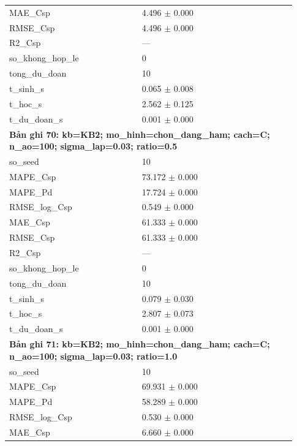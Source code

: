 \begin{longtable}{p{0.43\linewidth}p{0.50\linewidth}}
MAE\_\allowbreak Csp & 4.496 $\pm$ 0.000 \\
RMSE\_\allowbreak Csp & 4.496 $\pm$ 0.000 \\
R2\_\allowbreak Csp & — \\
so\_\allowbreak khong\_\allowbreak hop\_\allowbreak le & 0 \\
tong\_\allowbreak du\_\allowbreak doan & 10 \\
t\_\allowbreak sinh\_\allowbreak s & 0.065 $\pm$ 0.008 \\
t\_\allowbreak hoc\_\allowbreak s & 2.562 $\pm$ 0.125 \\
t\_\allowbreak du\_\allowbreak doan\_\allowbreak s & 0.001 $\pm$ 0.000 \\
\midrule
\multicolumn{2}{p{0.95\linewidth}}{\textbf{Bản ghi 70: kb=KB2; mo\_hinh=chon\_dang\_ham; cach=C; n\_ao=100; sigma\_lap=0.03; ratio=0.5}} \\
so\_\allowbreak seed & 10 \\
MAPE\_\allowbreak Csp & 73.172 $\pm$ 0.000 \\
MAPE\_\allowbreak Pd & 17.724 $\pm$ 0.000 \\
RMSE\_\allowbreak log\_\allowbreak Csp & 0.549 $\pm$ 0.000 \\
MAE\_\allowbreak Csp & 61.333 $\pm$ 0.000 \\
RMSE\_\allowbreak Csp & 61.333 $\pm$ 0.000 \\
R2\_\allowbreak Csp & — \\
so\_\allowbreak khong\_\allowbreak hop\_\allowbreak le & 0 \\
tong\_\allowbreak du\_\allowbreak doan & 10 \\
t\_\allowbreak sinh\_\allowbreak s & 0.079 $\pm$ 0.030 \\
t\_\allowbreak hoc\_\allowbreak s & 2.807 $\pm$ 0.073 \\
t\_\allowbreak du\_\allowbreak doan\_\allowbreak s & 0.001 $\pm$ 0.000 \\
\midrule
\multicolumn{2}{p{0.95\linewidth}}{\textbf{Bản ghi 71: kb=KB2; mo\_hinh=chon\_dang\_ham; cach=C; n\_ao=100; sigma\_lap=0.03; ratio=1.0}} \\
so\_\allowbreak seed & 10 \\
MAPE\_\allowbreak Csp & 69.931 $\pm$ 0.000 \\
MAPE\_\allowbreak Pd & 58.289 $\pm$ 0.000 \\
RMSE\_\allowbreak log\_\allowbreak Csp & 0.530 $\pm$ 0.000 \\
MAE\_\allowbreak Csp & 6.660 $\pm$ 0.000 \\

\end{longtable}
